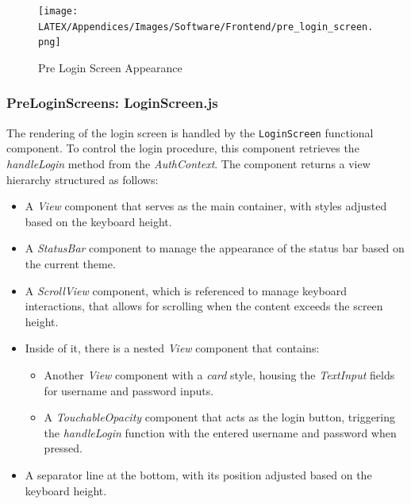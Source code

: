 \begin{figure}[!ht]
    \centering
    \texttt{[image: LATEX/Appendices/Images/Software/Frontend/pre\_login\_screen.png]}
    \caption{Pre Login Screen Appearance}
    \label{fig:pre login screen}
\end{figure}

\subsubsection{PreLoginScreens: LoginScreen.js}

The rendering of the login screen is handled by the \texttt{LoginScreen} functional component. To control the login procedure, this component retrieves the \textit{handleLogin} method from the \textit{AuthContext}. The component returns a view hierarchy structured as follows:

\begin{itemize}
    \item A \textit{View} component that serves as the main container, with styles adjusted based on the keyboard height.
    \item A \textit{StatusBar} component to manage the appearance of the status bar based on the current theme.
    \item A \textit{ScrollView} component, which is referenced to manage keyboard interactions, that allows for scrolling when the content exceeds the screen height.
    \item Inside of it, there is a nested \textit{View} component that contains:
    \begin{itemize}
        \item Another \textit{View} component with a \textit{card} style, housing the \textit{TextInput} fields for username and password inputs.
        \item A \textit{TouchableOpacity} component that acts as the login button, triggering the \textit{handleLogin} function with the entered username and password when pressed.
    \end{itemize}
    \item A separator line at the bottom, with its position adjusted based on the keyboard height.
\end{itemize}

